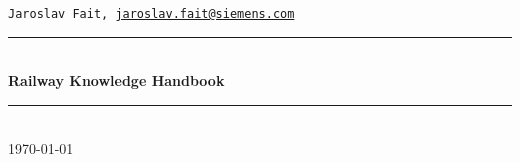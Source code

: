 \documentclass[
  fontsize=10pt,
  openany,
  chapterprefix=true]{scrbook}
\begin{document}
\begin{titlepage}
  \frontmatter %
  \vspace*{3cm} 
  \centering
  \texttt{\large Jaroslav Fait, 
          \href{mailto:jaroslav.fait@siemens.com}{jaroslav.fait@siemens.com}  }\\[1cm]
  \noindent\rule{\textwidth}{0.4mm} \\[0.4cm] 
  \textbf{\Huge Railway Knowledge Handbook}\\[0.1cm]
  \noindent\rule{\textwidth}{0.4mm} \\[1.4cm]
  \today
  \vfill
  \vspace*{1cm}
\end{titlepage}
\setcounter{tocdepth}{0} %
\setcounter{secnumdepth}{4} 
\dominitoc
\tableofcontents
\mainmatter 
\iftoggle{DEBUG}{
    
%    

}
{
    
%    
}
\backmatter 
  \printbibliography[title={Bibliografie}]
\end{document}
